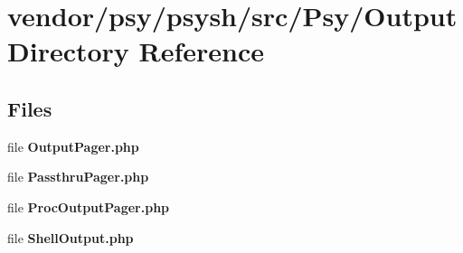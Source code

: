 \section{vendor/psy/psysh/src/\+Psy/\+Output Directory Reference}
\label{dir_11d088e7a8c5620d3110f4e71d71cd1f}
\subsection*{Files}
\begin{DoxyCompactItemize}
\item 
file {\bf Output\+Pager.\+php}
\item 
file {\bf Passthru\+Pager.\+php}
\item 
file {\bf Proc\+Output\+Pager.\+php}
\item 
file {\bf Shell\+Output.\+php}
\end{DoxyCompactItemize}
